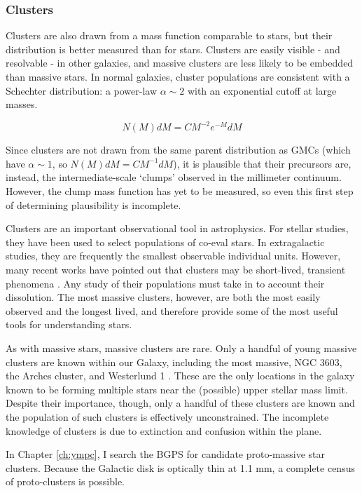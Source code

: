 \subsubsection{Clusters}
Clusters are also drawn from a mass function comparable to stars, but
their distribution is better measured than for stars.  Clusters are
easily visible - and resolvable - in other galaxies, and massive clusters are
less likely to be embedded than massive stars.  In normal galaxies, cluster
populations are consistent with a Schechter distribution: a power-law
$\alpha\sim2$ with an exponential cutoff at large masses.

$$N(M)dM = C M^{-2} e^{-M} dM$$

Since clusters are not drawn from the same parent distribution as GMCs (which
have $\alpha\sim1$, so $N(M) dM = C M^{-1} dM$), it is plausible that their
precursors are, instead, the intermediate-scale `clumps' observed in the
millimeter continuum.  However, the clump mass function has yet to be measured,
so even this first step of determining plausibility is incomplete.

Clusters are an important observational tool in astrophysics.  For stellar
studies, they have been used to select populations of co-eval stars.  In
extragalactic studies, they are frequently the smallest observable individual
units.  However, many recent works have pointed out that clusters may be
short-lived, transient phenomena
\citep{Kruijssen2011a,Whitehead2013a,Gieles2011a,Whitmore2009a}.  Any study of
their populations must take in to account their dissolution.  The most massive
clusters, however, are both the most easily observed and the longest lived, and
therefore provide some of the most useful tools for understanding stars.

As with massive stars, massive clusters are rare.  Only a handful of young
massive clusters are known within our Galaxy, including the most massive,  NGC
3603, the Arches cluster, and Westerlund 1 \citep{PortegiesZwart2010}.  These
are the only locations in the galaxy known to be forming multiple stars near
the (possible) upper stellar mass limit.  Despite their importance, though,
only a handful of these clusters are known and the population of such clusters
is effectively unconstrained.  The incomplete knowledge of clusters is due to
extinction and confusion within the plane.

In Chapter \ref{ch:ympc}, I search the BGPS for candidate proto-massive star
clusters.  Because the Galactic disk is optically thin at 1.1 mm, a complete
census of proto-clusters is possible.  

